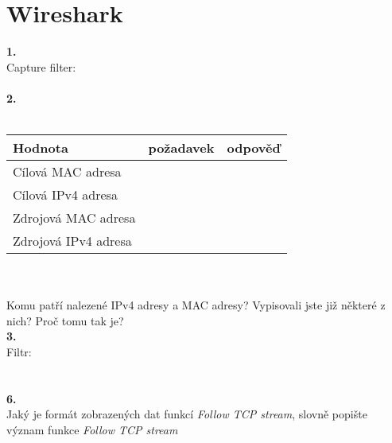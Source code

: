 \section{Wireshark}
\textbf{1.}\\
Capture filter:\\
\\
\textbf{2.}\\
\\
\begin{tabular}{|l|c|c|}
\hline
\textbf{Hodnota} & \textbf{požadavek} & \textbf{odpověď}\\
\hline
Cílová MAC adresa & \hspace{10em} & \hspace{10em} \\
\hline
Cílová IPv4 adresa & & \\
\hline
Zdrojová MAC adresa & & \\
\hline
Zdrojová IPv4 adresa & & \\
\hline
\end{tabular}
\vspace{2em}
\\
\vspace{6em} \\
Komu patří nalezené IPv4 adresy a MAC adresy? Vypisovali jste již některé z nich? Proč tomu tak je?\\
\textbf{3.}\\
Filtr:\\
\\
\vspace{2em} \\
\textbf{6.}\\
Jaký je formát zobrazených dat funkcí \emph{Follow TCP stream}, slovně popište
význam funkce \emph{Follow TCP stream}\\
